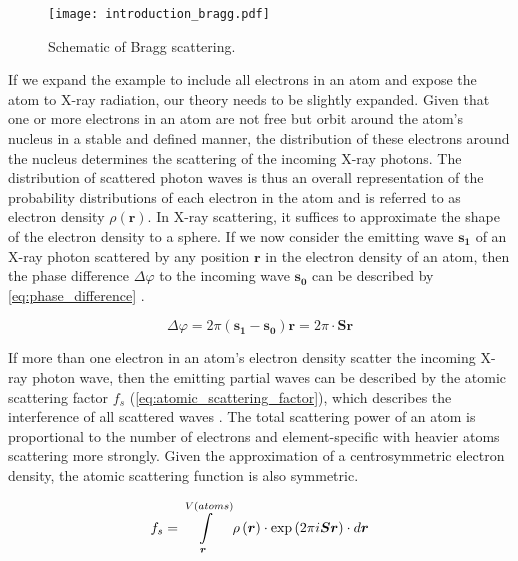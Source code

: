 \begin{figure}[H]
    \centering
    \texttt{[image: introduction\_bragg.pdf]}
    \caption{Schematic of Bragg scattering.}
    \label{fig:introduction_bragg}
\end{figure}

If we expand the example to include all electrons in an atom and expose the atom to X-ray radiation, our theory needs to be slightly expanded. Given that one or more electrons in an atom are not free but orbit around the atom's nucleus in a stable and defined manner, the distribution of these electrons around the nucleus determines the scattering of the incoming X-ray photons. The distribution of scattered photon waves is thus an overall representation of the probability distributions of each electron in the atom and is referred to as electron density $\rho(\boldsymbol{r})$. In X-ray scattering, it suffices to approximate the shape of the electron density to a sphere. If we now consider the emitting wave $\boldsymbol{s_1}$ of an X-ray photon scattered by any position $\boldsymbol{r}$ in the electron density of an atom, then the phase difference $\Delta\varphi$ to the incoming wave $\boldsymbol{s_0}$ can be described by \cref{eq:phase_difference} \cite{Rupp2010-nc}.

\begin{equation}
    \Delta\varphi=2\pi\left(\boldsymbol{s_1}-\boldsymbol{s_0}\right)\boldsymbol{r}=2\pi \cdot \boldsymbol{S}\boldsymbol{r}
    \label{eq:phase_difference}
\end{equation}

If more than one electron in an atom's electron density scatter the incoming X-ray photon wave, then the emitting partial waves can be described by the atomic scattering factor $f_s$ (\cref{eq:atomic_scattering_factor}), which describes the interference of all scattered waves \cite{Rupp2010-nc}. The total scattering power of an atom is proportional to the number of electrons and element-specific with heavier atoms scattering more strongly. Given the approximation of a centrosymmetric electron density, the atomic scattering function is also symmetric.

\begin{equation}
    f_s=\int\limits_{\boldsymbol{r}}^{V(atoms)}\rho\left(\boldsymbol{r}\right) \cdot \exp\left(2\pi\\i\boldsymbol{S}\boldsymbol{r}\right) \cdot d\boldsymbol{r}
    \label{eq:atomic_scattering_factor}
\end{equation}

